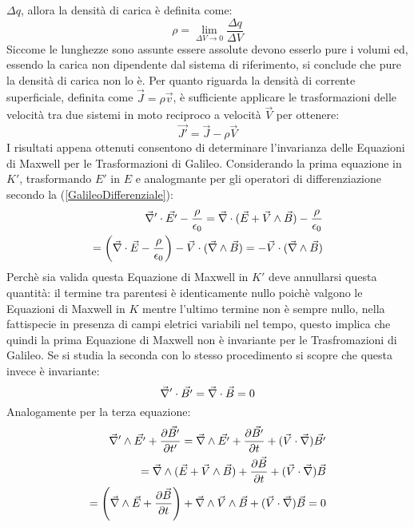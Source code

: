 $\Delta q$, allora la densità di carica è definita come:
\begin{equation*}
	\rho=\lim_{\Delta V\rightarrow 0}\frac{\Delta q}{\Delta V}
\end{equation*}
Siccome le lunghezze sono assunte essere assolute devono esserlo pure i volumi ed, 
essendo la carica non dipendente dal sistema di riferimento, si conclude che pure la 
densità di carica non lo è. Per quanto riguarda la densità di corrente superficiale, 
definita come $\vec{J}=\rho\vec{v}$,  
è sufficiente applicare le trasformazioni delle velocità tra due sistemi in moto reciproco 
a velocità $\vec{V}$ per ottenere:
\begin{equation}
	\vec{J'}=\vec{J}-\rho\vec{V}
\end{equation}
I risultati appena ottenuti consentono di determinare l'invarianza delle Equazioni di 
Maxwell per le Trasformazioni di Galileo. Considerando la prima equazione in $K'$, 
trasformando $E'$ in $E$ e analogmante per gli operatori di differenziazione secondo la (\ref{GalileoDifferenziale}):
\begin{align*}
	\vec{\nabla}'\cdot\vec{E'}-\frac{\rho}{\epsilon_0}=\vec{\nabla}\cdot(\vec{E}+\vec{V}\wedge\vec{B})-\frac{\rho}{\epsilon_0}\\
	=\left(\vec{\nabla}\cdot\vec{E}-\frac{\rho}{\epsilon_0}\right)-\vec{V}\cdot(\vec{\nabla}\wedge\vec{B})=-\vec{V}\cdot(\vec{\nabla}\wedge\vec{B})
\end{align*}
Perchè sia valida questa Equazione di Maxwell in $K'$ deve annullarsi questa quantità: 
il termine tra parentesi è identicamente nullo poichè valgono le Equazioni di Maxwell in $K$ 
mentre l'ultimo termine non è sempre nullo, nella fattispecie in presenza di campi eletrici variabili nel tempo, 
questo implica che quindi la prima Equazione di Maxwell non è invariante per le Trasfromazioni di Galileo.
Se si studia la seconda con lo stesso procedimento si scopre che questa invece è invariante:
\begin{equation*}
	\vec{\nabla}'\cdot\vec{B'}=\vec{\nabla}\cdot\vec{B}=0
\end{equation*}
Analogamente per la terza equazione:
\begin{align*}
	\vec{\nabla}'\wedge\vec{E'}+\frac{\partial \vec{B'}}{\partial t'}=
	\vec{\nabla}\wedge\vec{E'}+\frac{\partial \vec{B'}}{\partial t}+(\vec{V}\cdot\vec{\nabla})\vec{B'}\\
	=\vec{\nabla}\wedge(\vec{E}+\vec{V}\wedge\vec{B})+\frac{\partial \vec{B}}{\partial t}+(\vec{V}\cdot\vec{\nabla})\vec{B}\\
	=\left(\vec{\nabla}\wedge\vec{E}+\frac{\partial \vec{B}}{\partial t}\right)+\vec{\nabla}\wedge\vec{V}\wedge\vec{B}+(\vec{V}\cdot\vec{\nabla})\vec{B}=0
\end{align*} 
